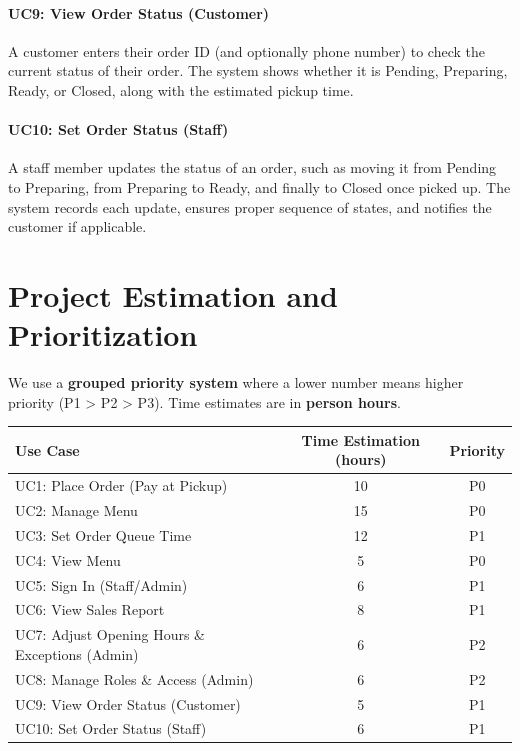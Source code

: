 \documentclass{article}
\begin{document}
\paragraph{UC9: View Order Status (Customer)}  
A customer enters their order ID (and optionally phone number) to check the current status of their order. The system shows whether it is Pending, Preparing, Ready, or Closed, along with the estimated pickup time.

\paragraph{UC10: Set Order Status (Staff)}  
A staff member updates the status of an order, such as moving it from Pending to Preparing, from Preparing to Ready, and finally to Closed once picked up. The system records each update, ensures proper sequence of states, and notifies the customer if applicable.


\section{Project Estimation and Prioritization}

We use a \textbf{grouped priority system} where a lower number means higher priority (P1 > P2 > P3).
Time estimates are in \textbf{person hours}.
\begin{center}
\begin{adjustbox}{max width=\textwidth}
\begin{tabular}{|l|c|c|}
\hline
\textbf{Use Case} & \textbf{Time Estimation (hours)} & \textbf{Priority} \\ \hline
UC1: Place Order (Pay at Pickup)                 & 10 & P0 \\ \hline
UC2: Manage Menu                                 & 15 & P0 \\ \hline
UC3: Set Order Queue Time                        & 12 & P1 \\ \hline
UC4: View Menu                                   & 5  & P0 \\ \hline
UC5: Sign In (Staff/Admin)                       & 6  & P1 \\ \hline
UC6: View Sales Report                           & 8  & P1 \\ \hline
UC7: Adjust Opening Hours \& Exceptions (Admin)  & 6  & P2 \\ \hline
UC8: Manage Roles \& Access (Admin)              & 6  & P2 \\ \hline
UC9: View Order Status (Customer)                & 5  & P1 \\ \hline
UC10: Set Order Status (Staff)                   & 6  & P1 \\ \hline
\end{tabular}
\end{adjustbox}
\end{center}
\end{document}
